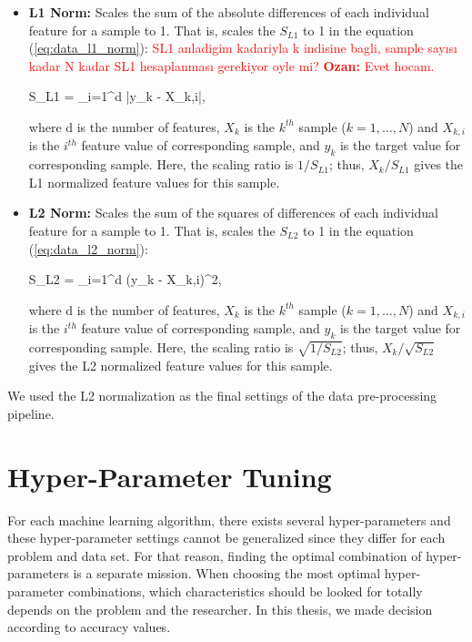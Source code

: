 \begin{itemize}
	\item \textbf{L1 Norm:} Scales the sum of the absolute differences of each individual feature for a sample to 1. That is, scales the $S_{L1}$ to 1 in the equation (\ref{eq:data_l1_norm}): \textcolor{red}{SL1 anladigim kadariyla k indisine bagli, sample sayısı kadar N kadar SL1 hesaplanması gerekiyor oyle mi? \textbf{Ozan:} Evet hocam.}
	
	\be
	\label{eq:data_l1_norm}
	S_{L1} = \sum_{i=1}^{d} \big|y_{k} - X_{k,i}\big|\:,
	\ee
	
	where d is the number of features, $X_{k}$ is the $k^{th}$ sample ($k=1,\ldots,N$) and $X_{k,i}$ is the $i^{th}$ feature value of corresponding sample, and $y_{k}$ is the target value for corresponding sample. Here, the scaling ratio is $1 / S_{L1}$; thus, $X_{k} / S_{L1}$ gives the L1 normalized feature values for this sample.
	
	\item \textbf{L2 Norm:} Scales the sum of the squares of differences of each individual feature for a sample to 1. That is, scales the $S_{L2}$ to 1 in the equation (\ref{eq:data_l2_norm}):
	
	\be
	\label{eq:data_l2_norm}
	S_{L2} = \sum_{i=1}^{d} \big(y_{k} - X_{k,i}\big)^{2}\:,
	\ee
	
	where d is the number of features, $X_{k}$ is the $k^{th}$ sample ($k=1,\ldots,N$) and $X_{k,i}$ is the $i^{th}$ feature value of corresponding sample, and $y_{k}$ is the target value for corresponding sample. Here, the scaling ratio is $\sqrt{1 / S_{L2}}$; thus, $X_{k} / \sqrt{S_{L2}}$ gives the L2 normalized feature values for this sample.
\end{itemize}

We used the L2 normalization as the final settings of the data pre-processing pipeline.

\section{Hyper-Parameter Tuning}

For each machine learning algorithm, there exists several hyper-parameters and these hyper-parameter settings cannot be generalized since they differ for each problem and data set. For that reason, finding the optimal combination of hyper-parameters is a separate mission. When choosing the most optimal hyper-parameter combinations, which characteristics should be looked for totally depends on the problem and the researcher. In this thesis, we made decision according to accuracy values.

